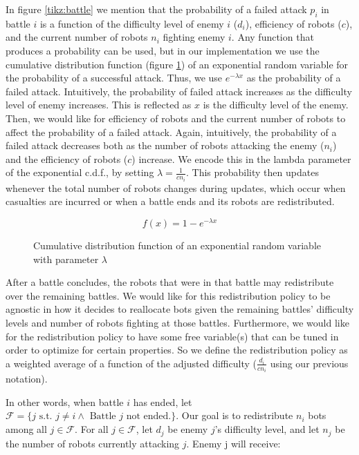 \documentclass[11pt]{article}
\theoremstyle{definition}
\begin{document}
In figure \ref{tikz:battle} we mention that the probability
of a failed attack $ p_i $ in battle $ i $ is a function of the
difficulty level of enemy $ i $ ($ d_i $),
efficiency of robots ($c$), and
the current number of robots $ n_i $ fighting enemy
$ i $. Any function that produces a probability can be
used, but in our implementation we use the cumulative
distribution function (figure \ref{fig:exp-cdf}) of an exponential
random variable for the probability of a successful attack.
%
Thus, we use $ e^{-\lambda x} $ as the probability
of a failed attack.
%
Intuitively, the probability of failed attack
increases as the difficulty level of enemy increases.
This is reflected as $ x $ is the difficulty level
of the enemy. Then, we would like for efficiency of
robots and the current number of robots to affect
the probability of a failed attack. Again,
intuitively, the probability of a failed attack
decreases both as the number of robots attacking
the enemy ($n_i$) and the efficiency of robots ($c$)
increase. We encode this in the lambda
parameter of the exponential c.d.f., by setting
$ \lambda = \frac{1}{c n_i} $. This probability
then updates whenever the total number of robots
changes during updates, which occur when casualties
are incurred or when a battle ends and its robots
are redistributed.

\begin{figure}
    \caption{Cumulative distribution function of an exponential random variable with parameter $\lambda$}
    \label{fig:exp-cdf}
    \centering
    $$ f(x) = 1 - e^{-\lambda x} $$
\end{figure}

After a battle concludes, the robots that were
in that battle may redistribute over the remaining battles.
We would like for this redistribution policy
to be agnostic in how it decides to reallocate
bots given the remaining battles' difficulty
levels and number of robots fighting at those battles.
Furthermore, we would like for the redistribution
policy to have some free variable(s) that can be
tuned in order to optimize for certain properties.
%
So we define the redistribution policy as a weighted
average of a function of the adjusted difficulty
($\frac{d_i}{c n_i}$ using our previous notation).

In other words, when battle $ i $ has ended,
let $ \mathcal{F} = \{ j \text{ s.t. } j \neq i \wedge \text{ Battle } j \text{ not ended.} \} $.
%
Our goal is to redistribute $ n_i $ bots among
all $ j \in \mathcal{F} $.
%
For all $ j \in \mathcal{F} $, let $ d_j $ be enemy
$j$'s difficulty level, and let $ n_j $ be the number
of robots currently attacking $j$. Enemy j will
receive:
\end{document}
